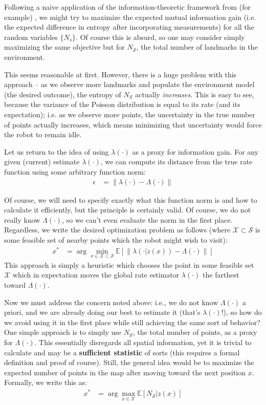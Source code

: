 \documentclass[12pt]{article}
\begin{document}
Following a naive application of the information-theoretic framework from (for example) \cite{bourgault}, we might try to maximize the expected mutual information gain (i.e. the expected difference in entropy after incorporating measurements) for all the random variables $\{N_s\}$. Of course this is absurd, so one may consider simply maximizing the same objective but for $N_{\mathcal{S}}$, the total number of landmarks in the environment.

This seems reasonable at first. However, there is a huge problem with this approach -- as we observe more landmarks and populate the environment model (the desired outcome), the entropy of $N_{\mathcal{S}}$ actually \textit{increases}. This is easy to see, because the variance of the Poisson distribution is equal to its rate (and its expectation); i.e. as we observe more points, the uncertainty in the true number of points actually increases, which means minimizing that uncertainty would force the robot to remain idle.

Let us return to the idea of using $\lambda(\cdot)$ as a proxy for information gain. For any given (current) estimate $\lambda(\cdot)$, we can compute its distance from the true rate function using some arbitrary function norm:
\begin{align}
  \epsilon &= \|\lambda(\cdot) - \Lambda(\cdot)\|
\end{align}

Of course, we will need to specify exactly what this function norm is and how to calculate it efficiently, but the principle is certainly valid. Of course, we do not really know $\Lambda(\cdot)$, so we can't even evaluate the norm in the first place. Regardless, we write the desired optimization problem as follows (where $\mathcal{X} \subset \mathcal{S}$ is some feasible set of nearby points which the robot might wish to visit):
\begin{align}
  x^* &= \arg \min_{x \in \mathcal{X} \subset \mathcal{S}}
  \mathbb{E}[\|\lambda(\cdot | z(x)) - \Lambda(\cdot)\|]
\end{align}
This approach is simply a heuristic which chooses the point in some feasible set $\mathcal{X}$ which in expectation moves the global rate estimator $\lambda(\cdot)$ the farthest toward $\Lambda(\cdot)$.

Now we must address the concern noted above: i.e., we do not know $\Lambda(\cdot)$ a priori, and we are already doing our best to estimate it (that's $\lambda(\cdot)$!), so how do we avoid using it in the first place while still achieving the same sort of behavior? One simple approach is to simply use $N_{\mathcal{S}}$, the total number of points, as a proxy for $\Lambda(\cdot)$. This essentially disregards all spatial information, yet it is trivial to calculate and may be a \textbf{sufficient statistic} of sorts (this requires a formal definition and proof of course). Still, the general idea would be to maximize the expected number of points in the map after moving toward the next position $x$. Formally, we write this as:
\begin{align}
  x^* &= \arg \max_{x \in \mathcal{X}} \mathbb{E}[N_{\mathcal{S}} | z(x)]
\end{align}
\end{document}
